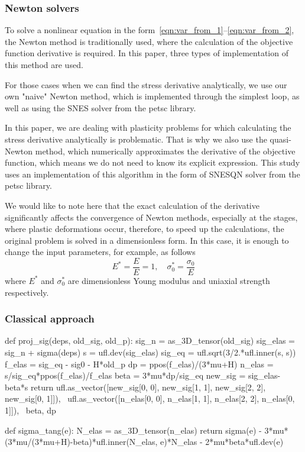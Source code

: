 \documentclass[12pt]{article}
\newcommand{\todounderline}[1]{\todo[inline, size=\scriptsize]{#1}}
\begin{document}
\subsubsection{Newton solvers}
To solve a nonlinear equation in the form~\ref{eqn:var_from_1}--\ref{eqn:var_from_2}, the Newton method is traditionally used, where the calculation of the objective function derivative is required. In this paper, three types of implementation of this method are used.

For those cases when we can find the stress derivative analytically, we use our own "naive" Newton method, which is implemented through the simplest loop, as well as using the SNES solver from the petsc library. 

In this paper, we are dealing with plasticity problems for which calculating the stress derivative analytically is problematic. That is why we also use the quasi-Newton method, which numerically approximates the derivative of the objective function, which means we do not need to know its explicit expression. This study uses an implementation of this algorithm in the form of SNESQN solver from the petsc library.

We would like to note here that the exact calculation of the derivative significantly affects the convergence of Newton methods, especially at the stages, where plastic deformations occur, therefore, to speed up the calculations, the original problem is solved in a dimensionless form. In this case, it is enough to change the input parameters, for example, as follows
\begin{equation}
    E^* = \frac{E}{E} = 1, \quad \sigma_0^* = \frac{\sigma_0}{E}
\end{equation}
where $E^*$ and $\sigma_0^*$ are dimensionless Young modulus and uniaxial strength respectively.

\subsubsection{Classical approach}
\todounderline{Complete this section}

\begin{pythoncode}
    def proj_sig(deps, old_sig, old_p):
        sig_n = as_3D_tensor(old_sig)
        sig_elas = sig_n + sigma(deps)
        s = ufl.dev(sig_elas)
        sig_eq = ufl.sqrt(3/2.*ufl.inner(s, s))
        f_elas = sig_eq - sig0 - H*old_p
        dp = ppos(f_elas)/(3*mu+H)
        n_elas = s/sig_eq*ppos(f_elas)/f_elas
        beta = 3*mu*dp/sig_eq
        new_sig = sig_elas-beta*s
        return ufl.as_vector([new_sig[0, 0], new_sig[1, 1], new_sig[2, 2], new_sig[0, 1]]), \
            ufl.as_vector([n_elas[0, 0], n_elas[1, 1], n_elas[2, 2], n_elas[0, 1]]), \
            beta, dp       

    def sigma_tang(e):
        N_elas = as_3D_tensor(n_elas)
        return sigma(e) - 3*mu*(3*mu/(3*mu+H)-beta)*ufl.inner(N_elas, e)*N_elas - 2*mu*beta*ufl.dev(e)  
\end{pythoncode}
\end{document}

